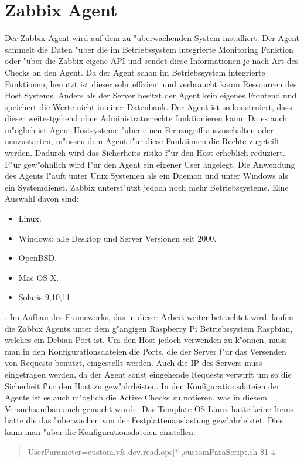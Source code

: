\section{Zabbix Agent}
\label{sec:agent}
Der Zabbix Agent wird auf dem zu "uberwachenden System installiert. Der Agent sammelt die Daten "uber die im Betriebssystem %
integrierte Monitoring Funktion oder "uber die Zabbix eigene API und sendet diese Informationen je nach Art des Checks an den Agent. %
Da der Agent schon im Betriebssystem integrierte Funktionen, benutzt ist dieser sehr effizient und verbraucht kaum %
Ressourcen des Host Systems. Anders als der Server besitzt der Agent kein eigenes Frontend und speichert die Werte nicht %
in einer Datenbank. Der Agent ist so konstruiert, dass dieser weitestgehend ohne Administratorrechte funktionieren kann. %
Da es auch m"oglich ist Agent Hostsysteme "uber einen Fernzugriff auszuschalten oder neuzustarten, m"ussen dem Agent f"ur diese Funktionen %
die Rechte zugeteilt werden. Dadurch wird das Sicherheits %
risiko f"ur den Host erheblich reduziert. F"ur gew"ohnlich wird f"ur den Agent ein eigener User angelegt. Die Anwendung des Agents %
l"auft unter Unix Systemen als ein Daemon und unter Windows als ein Systemdienst. Zabbix unterst"utzt jedoch noch mehr %
Betriebssysteme. Eine Auswahl davon sind: 
\begin{itemize}
\item Linux.
\item Windows: alle Desktop und Server Versionen seit 2000.
\item OpenBSD.
\item Mac OS X.
\item Solaris 9,10,11.
\end{itemize}
\autocite{zabbix:agent}. %
Im Aufbau des Frameworks, das in dieser Arbeit weiter betrachtet wird, laufen die Zabbix Agents unter dem g"angigen Raspberry Pi %
Betriebssystem Raspbian, welches ein Debian Port ist. Um den Host jedoch verwenden zu k"onnen, muss man in %
den Konfigurationsdateien die Ports, die der Server f"ur das Versenden von Requests benutzt, eingestellt werden. Auch die IP des Servers %
muss eingetragen werden, da der Agent sonst eingehende Requests verwirft um so die Sicherheit f"ur den Host zu gew"ahrleisten. %
In den Konfigurationsdateien der Agents ist es auch m"oglich %
die Active Checks zu notieren, was in diesem Versuchsaufbau auch gemacht wurde. Das Template OS Linux hatte keine Items hatte die das %
"uberwachen von der Festplattenauslastung gew"ahrleistet. Dies kann man "uber die Konfigurationsdateien einstellen: %
\begin{quote}

UserParameter=custom.vfs.dev.read.ops[*],customParaScript.sh \$1 4 

\end{quote}

